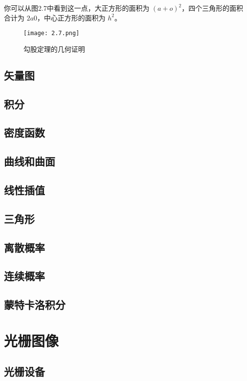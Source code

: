 \documentclass[lang=cn,10pt]{elegantbook}
\begin{document}
你可以从图2.7中看到这一点，大正方形的面积为 $(a+o)^2$，四个三角形的面积合计为 $2a0$，中心正方形的面积为 $h^2$。

\begin{figure}[htbp]
\centering
\texttt{[image: 2.7.png]}
\caption{勾股定理的几何证明}
\end{figure}


\section{矢量图}

\section{积分}

\section{密度函数}

\section{曲线和曲面}

\section{线性插值}

\section{三角形}

\section{离散概率}

\section{连续概率}

\section{蒙特卡洛积分}

\chapter{光栅图像}

\section{光栅设备}
\end{document}
